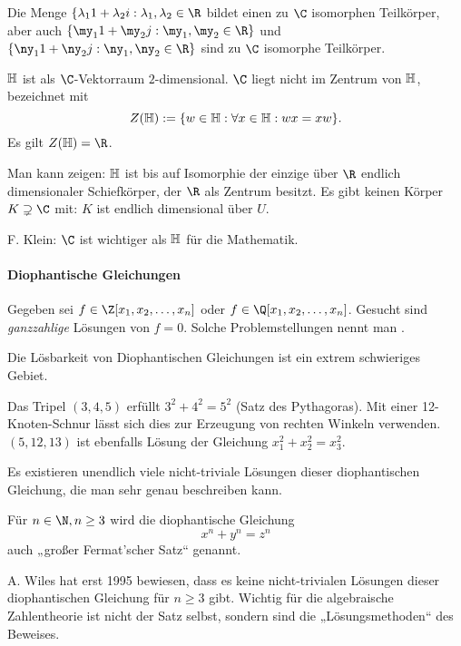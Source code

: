 Die Menge $\{ \lambda_1 1 + \lambda_2 i : \lambda_1, \lambda_2 \in \R$ bildet einen zu $\C$ isomorphen Teilkörper, aber auch $\{\my_1 1 + \my_2 j : \my_1, \my_2 \in \R\}$ und $\{\ny_1 1 + \ny_2 j : \ny_1, \ny_2 \in \R\}$ sind zu $\C$ isomorphe Teilkörper.

$\mathbb{H}$ ist als $\C$-Vektorraum $2$-dimensional.
$\C$ liegt nicht im Zentrum von $\mathbb{H}$, bezeichnet mit
\[
	Z(\mathbb{H}) := \{ w \in \mathbb{H} : \forall x \in \mathbb{H} : wx = xw \}.
\]
Es gilt $Z(\H) = \R$.

Man kann zeigen: $\mathbb{H}$ ist bis auf Isomorphie der einzige über $\R$ endlich dimensionaler Schiefkörper, der $\R$ als Zentrum besitzt.
Es gibt keinen Körper $K \supsetneq \C$ mit: $K$ ist endlich dimensional über $U$.

F. Klein: $\C$ ist wichtiger als $\mathbb{H}$ für die Mathematik.


\paragraph{Diophantische Gleichungen}

\begin{df*}
	Gegeben sei $f \in \Z[x_1, x_2, \dotsc, x_n]$ oder $f \in \Q[x_1, x_2, \dotsc, x_n]$.
	Gesucht sind \emph{ganzzahlige} Lösungen von $f = 0$.
	Solche Problemstellungen nennt man .
\end{df*}
Die Lösbarkeit von Diophantischen Gleichungen ist ein extrem schwieriges Gebiet.

\begin{ex*}
	Das Tripel $(3, 4, 5)$ erfüllt $3^2 + 4^2 = 5^2$ (Satz des Pythagoras).
	Mit einer 12-Knoten-Schnur lässt sich dies zur Erzeugung von rechten Winkeln verwenden.
	$(5, 12, 13)$ ist ebenfalls Lösung der Gleichung $x_1^2 + x_2^2 = x_3^2$.

	Es existieren unendlich viele nicht-triviale Lösungen dieser diophantischen Gleichung, die man sehr genau beschreiben kann.
\end{ex*}

\begin{ex*}
	Für $n \in \N, n \ge 3$ wird die diophantische Gleichung
	\[
		x^n + y^n = z^n
	\]
	auch „großer Fermat'scher Satz“ genannt.

	A. Wiles hat erst 1995 bewiesen, dass es keine nicht-trivialen Lösungen dieser diophantischen Gleichung für $n \ge 3$ gibt.
	Wichtig für die algebraische Zahlentheorie ist nicht der Satz selbst, sondern sind die „Lösungsmethoden“ des Beweises.
\end{ex*}

